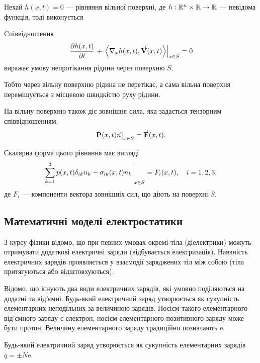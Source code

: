 Нехай $h(x, t) = 0$ --- рівняння вільної поверхні, де $h: \mathbb{R}^n\times \mathbb{R} \to \mathbb{R}$ --- невідома функція, тоді виконується
\begin{th_condition}
	Cпіввідношення 
	\begin{equation}
		\left. \frac{\partial h(x, t)}{\partial t} \right. + \left. \langle \nabla_x h(x , t), \vecf V(x,t) \rangle \right|_{x \in S} = 0
	\end{equation}
	виражає умову непротікання рідини через поверхню $S$.
\end{th_condition}

\begin{remark}
	Тобто через вільну поверхню рідина не перетікає, а сама вільна поверхня переміщується з місцевою швидкістю руху рідини.
\end{remark}

На вільну поверхню також діє зовнішня сила, яка задається тензорним співвідношенням:
\begin{equation}
	\left. \dot{\textbf{P}}(x, t) \vec n \right|_{x \in S} = {\vec{\mathbf{F}}}(x, t).
\end{equation}

Скалярна форма цього рівняння має вигляді
\begin{equation}
	\left. \displaystyle\sum\limits_{k = 1}^3 p(x, t) \delta_{ik} n_k - \sigma_{ik}(x, t) n_k \right|_{x \in S} = F_i(x, t), \quad i = 1, 2, 3,
\end{equation}
де $F_i$ --- компоненти вектора зовнішніх сил, що діють на поверхні $S$.

\subsection{Математичні моделі електростатики}

З курсу фізики відомо, що при певних умовах окремі тіла (діелектрики) можуть отримувати додаткові електричні заряди (відбувається електризація). Наявність електричних зарядів проявляється у взаємодії заряджених тіл між собою (тіла притягуються або відштовхуються). \medskip

Відомо, що існують два види електричних зарядів, які умовно поділяються на додатні та від'ємні. Будь-який електричний заряд утворюється як сукупність елементарних неподільних за величиною зарядів. Носієм такого елементарного від'ємного заряду є електрон, носієм елементарного позитивного заряду може бути протон. Величину елементарного заряду традиційно позначають $\mathrm{e}$. \medskip

Будь-який електричний заряд утворюється як сукупність елементарних зарядів $q = \pm N \mathrm{e}$. \medskip

